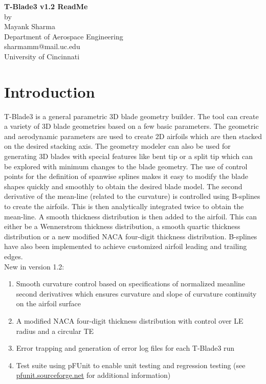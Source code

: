 \documentclass[8pt]{article}
\begin{document}
\begin{center}
\textbf{\large T-Blade3 v1.2 ReadMe}\\
by\\
Mayank Sharma\\
Department of Aerospace Engineering\\
sharmamm@mail.uc.edu\\
University of Cincinnati\\
[1cm]
\end{center}

\section{Introduction}
\noindent
T-Blade3 is a general parametric 3D blade geometry builder\cite{KiranPaper}. The tool can create a variety of 3D blade geometries based on a few basic parameters. The geometric and aerodynamic parameters are used to create 2D airfoils which are then stacked on the desired stacking axis\cite{KiranThesis}. The geometry modeler can also be  used for generating 3D blades with special features like bent tip or a split tip\cite{AbhayThesis} which can be explored with minimum changes to the blade geometry. The use of control points for the definition of spanwise splines makes it easy to modify the blade shapes quickly and smoothly to obtain the desired blade model\cite{SyedPaper}. The second derivative of the mean-line (related to the curvature) is controlled using B-splines to create the airfoils. This is then analytically integrated twice to obtain the mean-line\cite{AhmedPaper}. A smooth thickness distribution is then added to the airfoil. This can either be a Wennerstrom thickness distribution\cite{WennerstromBook}, a smooth quartic thickness distribution or a new modified NACA four-digit thickness distribution\cite{AbbottText}. B-splines have also been implemented to achieve customized airfoil leading and trailing edges.\\

\noindent
New in version 1.2:

\begin{enumerate}[leftmargin=*]
    \item Smooth curvature control based on specifications of normalized meanline second derivatives which ensures curvature and slope of curvature continuity on the airfoil surface
    \item A modified NACA four-digit thickness distribution with control over LE radius and a circular TE
    \item Error trapping and generation of error log files for each T-Blade3 run
    \item Test suite using pFUnit to enable unit testing and regression testing (see \url{pfunit.sourceforge.net} for additional information)
\end{enumerate}
\end{document}
